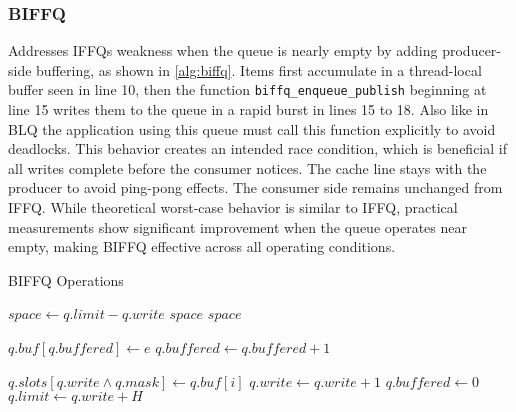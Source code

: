 \subsubsection{\acf{BIFFQ}}
Addresses \acsp{IFFQ} weakness when the queue is nearly empty by adding producer-side buffering, as shown in \cref{alg:biffq}. Items first accumulate in a thread-local buffer seen in line 10, then the function \texttt{biffq\_enqueue\_publish} beginning at line 15 writes them to the queue in a rapid burst in lines 15 to 18. Also like in \ac{BLQ} the application using this queue must call this function explicitly to avoid deadlocks. This behavior creates an intended race condition, which is beneficial if all writes complete before the consumer notices. The cache line stays with the producer to avoid ping-pong effects. The consumer side remains unchanged from \ac{IFFQ}. While theoretical worst-case behavior is similar to \ac{IFFQ}, practical measurements show significant improvement when the queue operates near empty, making \ac{BIFFQ} effective across all operating conditions. \cite{MaffioneCacheAware}

\begin{algorithm}[!ht]
   \centering
   \captionsetup{justification=centering}
   \caption{\ac{BIFFQ} Operations \cite{MaffioneCacheAware}}
   \label{alg:biffq}
   \scriptsize
   \begin{algorithmic}[1]
           \State $space \gets q.limit - q.write$
               \State \Return $space$ 
           \EndIf
           \State \Return $space$
       \EndFunction
       
       \State
       
           \State $q.buf[q.buffered] \gets e$ 
           \State $q.buffered \gets q.buffered + 1$
       \EndFunction
       
       \State
       
               \State $q.slots[q.write \land q.mask] \gets q.buf[i]$ 
               \State $q.write \gets q.write + 1$
           \EndFor
           \State $q.buffered \gets 0$
           \State $q.limit \gets q.write + H$ 
       \EndFunction
   \end{algorithmic}
\end{algorithm}

